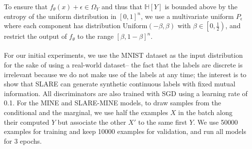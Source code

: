\documentclass{NSF}
\begin{document}
To ensure that $f_\theta(x)+\epsilon \in \Omega_Y$ and thus that $\mathbb{H}[Y]$ is bounded above by the entropy of the uniform distribution in $[0,1]^n$, we use a multivariate
uniform $P_\epsilon$ where each component has distribution
$\mathrm{Uniform}(-\beta, \beta)$ with $\beta \in \left[0,\frac{1}{2}\right)$, and
restrict the output of $f_\theta$ to the range $[\beta, 1 - \beta]^n$.
\\
\\
For our initial experiments, we use the MNIST dataset \citep{deng2012mnist} as the input distribution for the sake of using a real-world dataset-- the fact that the labels are discrete is irrelevant because we do not make use of the labels at any time; the interest is to show that SLARE can generate synthetic continuous labels with fixed mutual information. All discriminators are also trained with SGD using a learning rate of 0.1. For the MINE and SLARE-MINE models, to draw samples from the conditional and the marginal, we use half the examples $X$ in the batch along their computed $Y$ but associate the other $X'$ to the same first $Y$. We use 50000 examples for training and keep 10000 examples for validation, and run all models for 3 epochs.
\\
\\
\end{document}
